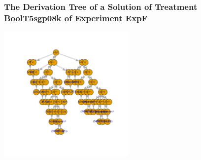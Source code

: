  \begin{frame}
 \frametitle{ The Derivation Tree of a Solution of Treatment BoolT5sgp08k of Experiment ExpF }
 \begin{center}
\includegraphics[width=0.5\textwidth, angle=0]
{ExpFDerivationTreeFigure006.pdf}
 \end{center}
 \label{report/ExpFDerivationTreeFigure006.pdf}  
 \end{frame}

